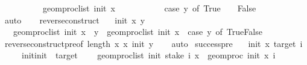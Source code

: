 \begin{isabellebody}
\ \ \ \ \ \ \ \ \ \ geom{\isacharunderscore}{\kern0pt}proc{\isacharunderscore}{\kern0pt}list\ init\ x\ {\isacharplus}{\kern0pt}\isanewline
\ \ \ \ \ \ \ \ \ \ {\isacharparenleft}{\kern0pt}case\ y\ of\ True\ {\isasymRightarrow}\ {}\ {\isacharbar}{\kern0pt}\ False\ {\isasymRightarrow}\ {\isacharminus}{\kern0pt}\ {}{\isacharparenright}{\kern0pt}{\isachardoublequoteclose}\isanewline
\ \ \ \ \ \ \isamarkupfalse%
\ auto\isanewline
\ \ \isamarkupfalse%
\isanewline
{}\isamarkupfalse%
%
\endisatagproof
{\isafoldproof}%
%
\isadelimproof
\isanewline
%
\endisadelimproof
\isanewline
{}\isamarkupfalse%
\ reverse{\isacharunderscore}{\kern0pt}construct{\isacharcolon}{\kern0pt}\isanewline
\ \ \ init\ x\ y\isanewline
\ \ \ {\isachardoublequoteopen}geom{\isacharunderscore}{\kern0pt}proc{\isacharunderscore}{\kern0pt}list\ init\ {\isacharparenleft}{\kern0pt}x\ {\isacharat}{\kern0pt}\ {\isacharbrackleft}{\kern0pt}y{\isacharbrackright}{\kern0pt}{\isacharparenright}{\kern0pt}\ {\isacharequal}{\kern0pt}\ geom{\isacharunderscore}{\kern0pt}proc{\isacharunderscore}{\kern0pt}list\ init\ x\ {\isacharplus}{\kern0pt}\ {\isacharparenleft}{\kern0pt}case\ y\ of\ True{\isasymRightarrow}{}{\isacharbar}{\kern0pt}False{\isasymRightarrow}\ {\isacharminus}{\kern0pt}{}{\isacharparenright}{\kern0pt}{\isachardoublequoteclose}\isanewline
%
\isadelimproof
\ \ %
\endisadelimproof
%
\isatagproof
{}\isamarkupfalse%
\ reverse{\isacharunderscore}{\kern0pt}construct{\isacharunderscore}{\kern0pt}pre{\isacharbrackleft}{\kern0pt}of\ {\isachardoublequoteopen}length\ x{\isachardoublequoteclose}\ x\ init\ y{\isacharbrackright}{\kern0pt}\isanewline
\ \ \isamarkupfalse%
\ auto%
\endisatagproof
{\isafoldproof}%
%
\isadelimproof
\isanewline
%
\endisadelimproof
\isanewline
{}\isamarkupfalse%
\ success{\isacharunderscore}{\kern0pt}pre{\isacharcolon}{\kern0pt}\isanewline
\ \ \ init\ x\ target\ i\isanewline
\ \ \ {\isachardoublequoteopen}{}\ {\isacharless}{\kern0pt}\ init{\isachardoublequoteclose}{\isachardoublequoteopen}init\ {\isacharless}{\kern0pt}\ target{\isachardoublequoteclose}\ \isanewline
\ \ \ {\isachardoublequoteopen}geom{\isacharunderscore}{\kern0pt}proc{\isacharunderscore}{\kern0pt}list\ init\ {\isacharparenleft}{\kern0pt}stake\ i\ x{\isacharparenright}{\kern0pt}\ {\isacharequal}{\kern0pt}\ geom{\isacharunderscore}{\kern0pt}proc\ init\ x\ i{\isachardoublequoteclose}\isanewline

\end{isabellebody}

